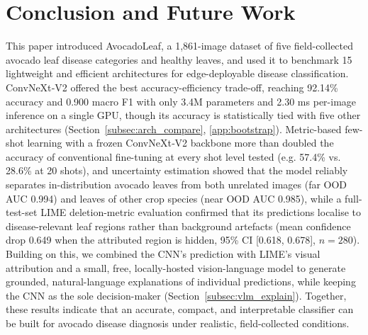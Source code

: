 \section{Conclusion and Future Work}
\label{sec:conclusion}

This paper introduced AvocadoLeaf, a 1,861-image dataset of five field-collected avocado leaf disease categories and healthy leaves, and used it to benchmark 15 lightweight and efficient architectures for edge-deployable disease classification. ConvNeXt‑V2 offered the best accuracy-efficiency trade-off, reaching 92.14\% accuracy and 0.900 macro F1 with only 3.4M parameters and 2.30 ms per-image inference on a single GPU, though its accuracy is statistically tied with five other architectures (Section~\ref{subsec:arch_compare}, \ref{app:bootstrap}). Metric-based few-shot learning with a frozen ConvNeXt‑V2 backbone more than doubled the accuracy of conventional fine-tuning at every shot level tested (e.g. 57.4\% vs. 28.6\% at 20 shots), and uncertainty estimation showed that the model reliably separates in-distribution avocado leaves from both unrelated images (far OOD AUC 0.994) and leaves of other crop species (near OOD AUC 0.985), while a full-test-set LIME deletion-metric evaluation confirmed that its predictions localise to disease-relevant leaf regions rather than background artefacts (mean confidence drop 0.649 when the attributed region is hidden, 95\% CI [0.618, 0.678], $n=280$). Building on this, we combined the CNN's prediction with LIME's visual attribution and a small, free, locally-hosted vision-language model to generate grounded, natural-language explanations of individual predictions, while keeping the CNN as the sole decision-maker (Section~\ref{subsec:vlm_explain}). Together, these results indicate that an accurate, compact, and interpretable classifier can be built for avocado disease diagnosis under realistic, field-collected conditions.

